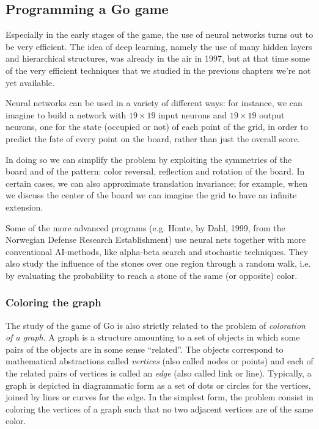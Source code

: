 \subsection{Programming a Go game}
Especially in the early stages of the game, the use of neural networks turns out to be very efficient. The idea of deep learning, namely the use of many hidden layers and hierarchical structures, was already in the air in 1997, but at that time some of the very efficient techniques that we studied in the previous chapters we're not yet available.

Neural networks can be used in a variety of different ways: for instance, we can imagine to build a network with $19\times19$ input neurons and $19\times19$ output neurons, one for the state (occupied or not) of each point of the grid, in order to predict the fate of every point on the board, rather than just the overall score.

In doing so we can simplify the problem by exploiting the symmetries of the board and of the pattern: color reversal, reflection and rotation of the board. In certain cases, we can also approximate translation invariance; for example, when we discuss the center of the board we can imagine the grid to have an infinite extension.

Some of the more advanced programs (e.g. Honte, by Dahl, 1999, from the Norwegian Defense Research Establishment) use neural nets together with more conventional AI-methods, like alpha-beta search and stochastic techniques. They also study the influence of the stones over one region through a random walk, i.e. by evaluating the probability to reach a stone of the same (or opposite) color.
\subsubsection{Coloring the graph}
The study of the game of Go is also strictly related to the problem of \emph{coloration of a graph}. A graph is a structure amounting to a set of objects in which some pairs of the objects are in some sense ``related''. The objects correspond to mathematical abstractions called \emph{vertices} (also called nodes or points) and each of the related pairs of vertices is called an \emph{edge} (also called link or line). Typically, a graph is depicted in diagrammatic form as a set of dots or circles for the vertices, joined by lines or curves for the edge. In the simplest form, the problem consist in coloring the vertices of a graph such that no two adjacent vertices are of the same color.

